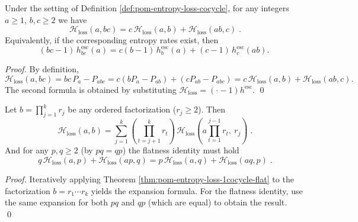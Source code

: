 \begin{theorem}\label{thm:pom-entropy-loss-1cocycle-flat}
Under the setting of Definition \ref{def:pom-entropy-loss-cocycle}, for any integers \(a\ge 1\), \(b,c\ge 2\) we have
\[
\boxed{\;
\mathcal{H}_{\mathrm{loss}}(a,bc)=c\,\mathcal{H}_{\mathrm{loss}}(a,b)+\mathcal{H}_{\mathrm{loss}}(ab,c)\; }.
\]
Equivalently, if the corresponding entropy rates exist, then
\[
(bc-1)\,h^{\mathrm{esc}}_{bc}(a)=c(b-1)\,h^{\mathrm{esc}}_{b}(a)+(c-1)\,h^{\mathrm{esc}}_{c}(ab).
\]
\end{theorem}
\begin{proof}
By definition,
\[
\mathcal{H}_{\mathrm{loss}}(a,bc)
=bc\,P_a-P_{abc}
=c(bP_a-P_{ab})+(cP_{ab}-P_{abc})
=c\,\mathcal{H}_{\mathrm{loss}}(a,b)+\mathcal{H}_{\mathrm{loss}}(ab,c).
\]
The second formula is obtained by substituting \(\mathcal{H}_{\mathrm{loss}}=(\cdot-1)h^{\mathrm{esc}}\). \qed
\end{proof}
\begin{corollary}\label{cor:pom-entropy-loss-factor-chain-expansion}
Let \(b=\prod_{j=1}^{k} r_j\) be any ordered factorization (\(r_j\ge 2\)).
Then
\[
\boxed{\;
\mathcal{H}_{\mathrm{loss}}(a,b)
=
\sum_{j=1}^{k}\left(\prod_{t=j+1}^{k} r_t\right)\,
\mathcal{H}_{\mathrm{loss}}\!\left(a\prod_{t=1}^{j-1}r_t,\ r_j\right)\; }.
\]
And for any \(p,q\ge 2\) (by \(pq=qp\)) the flatness identity must hold
\[
\boxed{\;
q\,\mathcal{H}_{\mathrm{loss}}(a,p)+\mathcal{H}_{\mathrm{loss}}(ap,q)
=
p\,\mathcal{H}_{\mathrm{loss}}(a,q)+\mathcal{H}_{\mathrm{loss}}(aq,p)\; }.
\]
\end{corollary}
\begin{proof}
Iteratively applying Theorem \ref{thm:pom-entropy-loss-1cocycle-flat} to the factorization \(b=r_1\cdots r_k\) yields the expansion formula.
For the flatness identity, use the same expansion for both \(pq\) and \(qp\) (which are equal) to obtain the result. \qed
\end{proof}
